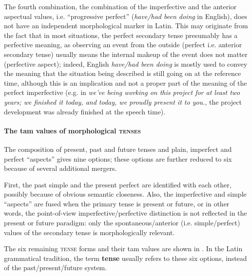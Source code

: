 \documentclass[a4paper, oneside, 12pt]{report}
\newcommand*{\concept}[1]{\textbf{#1}}
\newcommand{\form}[1]{\emph{#1}}
\newcommand*{\category}[1]{\textsc{#1}}
\begin{document}
The fourth combination, the combination of the imperfective and the anterior aspectual values, 
i.e. ``progressive perfect'' (\form{have/had been doing} in English),
does not have an independent morphological marker in Latin.
This may originate from the fact that in most situations, 
the perfect secondary tense presumably has a perfective meaning,
as observing an event from the outside (perfect i.e. anterior secondary tense)
usually means the internal makeup of the event does not matter (perfective aspect);
indeed, English \form{have/had been doing}
is mostly used to convey the meaning that the situation being described is still going on
at the reference time,
although this is an implication and not a proper part of the meaning of the perfect imperfective
(e.g. in \form{we've being working on this project for at least two years;
we finished it today, and today, we proudly present it to you.},
the project development was already finished at the speech time).

\paragraph*{The \ac{tam} values of morphological \category{tenses}}
\label{sec:verb.paradigm.tam.tense-combination}
The composition of present, past and future tenses
and plain, imperfect and perfect ``aspects''
gives nine options;
these options are further reduced to six because of several additional mergers.

First, the past simple and the present perfect are identified with each other,
possibly because of obvious semantic closeness.
Also, the imperfective and simple ``aspects'' are fused 
when the primary tense is present or future,
or in other words, the point-of-view imperfective/perfective distinction is not reflected
in the present or future paradigm:
only the spontaneous/anterior (i.e. simple/perfect) values of the secondary tense is morphologically relevant.

The six remaining \category{tense} forms and their \ac{tam} values
are shown in .
In the Latin grammatical tradition, 
the term \concept{tense} 
usually refers to these six options,
instead of the past/present/future system.

\begin{table}[H]
    \caption{Latin \category{tenses}}
    \label{tbl:latin-tense-aspect}
    \centering
        
\end{table}
\end{document}
